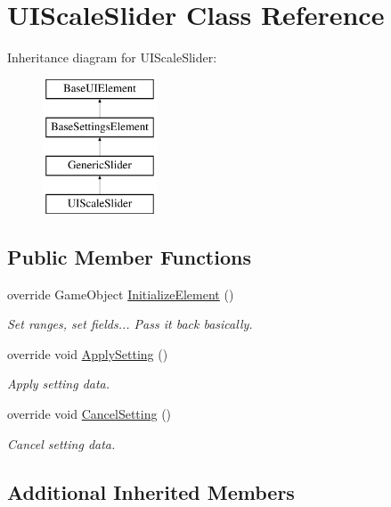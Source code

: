 \hypertarget{class_u_i_scale_slider}{}\section{U\+I\+Scale\+Slider Class Reference}
\label{class_u_i_scale_slider}
Inheritance diagram for U\+I\+Scale\+Slider\+:\begin{figure}[H]
\begin{center}
\leavevmode
\includegraphics[height=4.000000cm]{class_u_i_scale_slider}
\end{center}
\end{figure}
\subsection*{Public Member Functions}
\begin{DoxyCompactItemize}
\item 
override Game\+Object \hyperlink{class_u_i_scale_slider_a903948c2821f73a3f820fc22ae0064c3}{Initialize\+Element} ()
\begin{DoxyCompactList}\small\item\em Set ranges, set fields... Pass it back basically. \end{DoxyCompactList}\item 
override void \hyperlink{class_u_i_scale_slider_a71d07c681d338c8966be167f0a7aa4d0}{Apply\+Setting} ()
\begin{DoxyCompactList}\small\item\em Apply setting data. \end{DoxyCompactList}\item 
override void \hyperlink{class_u_i_scale_slider_ad9ee67106d15b871f0f9920d18747296}{Cancel\+Setting} ()
\begin{DoxyCompactList}\small\item\em Cancel setting data. \end{DoxyCompactList}\end{DoxyCompactItemize}
\subsection*{Additional Inherited Members}



